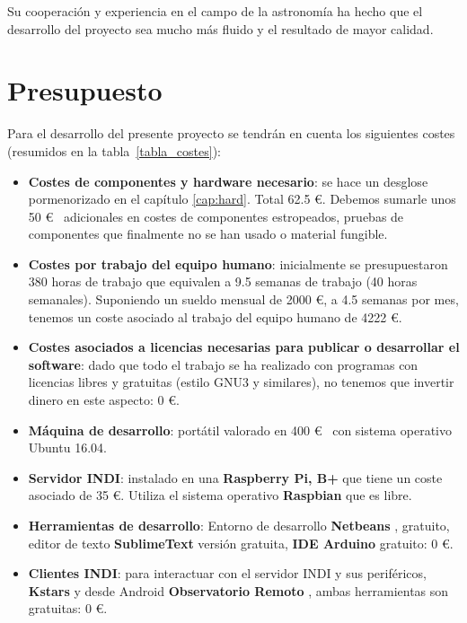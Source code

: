 \begin{itemize}
\begin{itemize}
\begin{itemize}
Su cooperación y experiencia en el campo de la astronomía ha hecho que el desarrollo del proyecto sea mucho más fluido y el resultado de mayor calidad.  


\section{Presupuesto}

Para el desarrollo del presente proyecto se tendrán en cuenta los siguientes costes (resumidos en la tabla~\ref{tabla_costes}):

\begin{itemize}
	\item \textbf{Costes de componentes y hardware necesario}: se hace un desglose pormenorizado en el capítulo \ref{cap:hard}. Total 62.5 \euro. Debemos sumarle unos 50 \euro ~ adicionales en costes de componentes estropeados, pruebas de componentes que finalmente no se han usado o material fungible.
	
	\item \textbf{Costes por trabajo del equipo humano}: inicialmente se presupuestaron 380 horas de trabajo que equivalen a 9.5 semanas de trabajo (40 horas semanales). Suponiendo un sueldo mensual de 2000 \euro, a 4.5 semanas por mes, tenemos un coste asociado al trabajo del equipo humano de 4222 \euro.
	
	\item \textbf{Costes asociados a licencias necesarias para publicar o desarrollar el software}: dado que todo el trabajo se ha realizado con programas con licencias libres y gratuitas (estilo GNU3 \cite{GNU3} y similares), no tenemos que invertir dinero en este aspecto: 0 \euro.

	\item \textbf{Máquina de desarrollo}: portátil valorado en 400 \euro ~ con sistema operativo Ubuntu 16.04.
	
	\item \textbf{Servidor INDI}: instalado en una \textbf{Raspberry Pi, B+} que tiene un coste asociado de 35 \euro. Utiliza el sistema operativo \textbf{Raspbian} \cite{raspbian} que es libre.
	
	\item \textbf{Herramientas de desarrollo}: Entorno de desarrollo \textbf{Netbeans} \cite{netbeans}, gratuito, editor de texto \textbf{SublimeText} \cite{sublimetext} versión gratuita, \textbf{IDE Arduino} \cite{arduinoide} gratuito: 0 \euro.
	
	\item \textbf{Clientes INDI}: para interactuar con el servidor INDI y sus periféricos, \textbf{Kstars} \cite{kstars} y desde Android \textbf{Observatorio Remoto} \cite{obsremoto}, ambas herramientas son gratuitas: 0 \euro.
	

\end{itemize}
\end{itemize}
\end{itemize}
\end{itemize}
